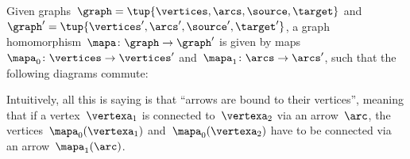 \section{}

\begin{definition}
\label{def:graph_homom}
Given graphs~$\graph=\tup{\vertices,\arcs,\source,\target}$ and~$\graph'=\tup{\vertices',\arcs',\source',\target'}$, a graph homomorphism~$\mapa \colon \graph \to \graph'$ is given by maps~$\mapa_0\colon \vertices \to \vertices'$ and~$\mapa_1\colon \arcs \to \arcs'$, such that the following diagrams commute:
 \begin{center}
 \end{center}
\end{definition}
\begin{remark}
Intuitively, all this is saying is that ``arrows are bound to their vertices'', meaning that if a vertex~$\vertexa_1$ is connected to~$\vertexa_2$ via an arrow~$\arc$, the vertices~$\mapa_0(\vertexa_1)$ and~$\mapa_0(\vertexa_2)$ have to be connected via an arrow~$\mapa_1(\arc)$.
\end{remark}